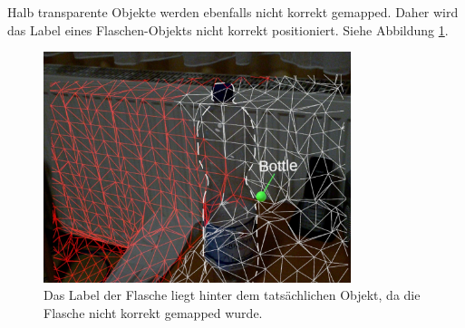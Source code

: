 Halb transparente Objekte werden ebenfalls nicht korrekt gemapped. Daher wird das Label eines Flaschen-Objekts nicht korrekt positioniert. Siehe Abbildung \ref{img:flasche}.

\begin{figure}[H]
	\centering
	\includegraphics[width=0.8\textwidth]{images/ML_20201004_19.12.13_2.jpg}
	\caption[Spatial Mapping transparenter Objekte]{Das Label der Flasche liegt hinter dem tatsächlichen Objekt, da die Flasche nicht korrekt gemapped wurde.}
	\label{img:flasche}
\end{figure}
